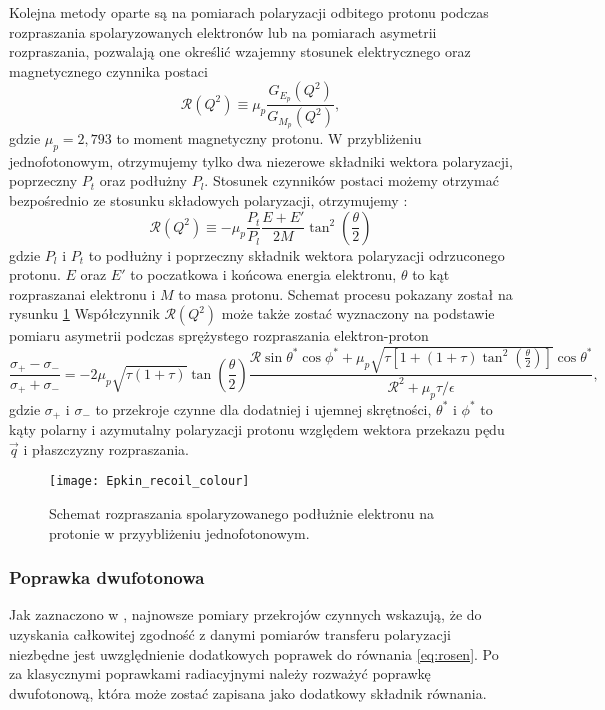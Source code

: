 \documentclass[11pt]{book}
\theoremstyle{definition}
\begin{document}
Kolejna metody oparte są na pomiarach polaryzacji odbitego protonu podczas rozpraszania spolaryzowanych elektronów lub na pomiarach asymetrii rozpraszania, pozwalają one określić wzajemny stosunek elektrycznego oraz magnetycznego czynnika postaci
%
$$
\mathcal{R}\left(Q^2\right) \equiv \mu_p \frac{G_{E_p}\left(Q^2\right)}{G_{M_p}\left(Q^2\right)},
$$
gdzie $\mu_p = 2,793$ to moment magnetyczny protonu. W przybliżeniu jednofotonowym, otrzymujemy tylko dwa niezerowe składniki wektora polaryzacji, poprzeczny $P_t$ oraz podłużny $P_l$. Stosunek czynników postaci możemy otrzymać bezpośrednio ze stosunku składowych polaryzacji, otrzymujemy \cite{2007PrPNP..59..694P}:
%
$$
\mathcal{R}\left(Q^2\right) \equiv -\mu_p  \frac{P_t}{P_l} \frac{E + E'}{2M} \tan^2  \left(\frac{\theta}{2}\right) 
$$
%
gdzie $P_l$ i $P_t$ to podłużny i poprzeczny składnik wektora polaryzacji odrzuconego protonu. $E$ oraz $E'$ to poczatkowa i końcowa energia elektronu, $\theta$ to kąt rozpraszanai elektronu i $M$ to masa protonu. Schemat procesu pokazany został na rysunku \ref{fig:recoil}
%
Współczynnik $\mathcal{R}\left(Q^2\right)$ może także zostać wyznaczony na podstawie pomiaru asymetrii podczas sprężystego rozpraszania elektron-proton \cite{2009PhRvC..79f5204A, 2007PrPNP..59..694P}
%
$$
\frac{\sigma_+ - \sigma_-}{\sigma_+ + \sigma_-} = -2\mu_p \sqrt{\tau \left(1+\tau\right)} \tan \left(\frac{\theta}{2}\right) \frac{\mathcal{R} \sin \theta^* \cos \phi^* + \mu_p \sqrt{\tau \left[ 1 + \left(1+\tau\right) \tan^2 \left(\frac{\theta}{2}\right) \right]} \cos \theta^* }{\mathcal{R}^2 + \mu_p \tau / \epsilon},
$$
%
gdzie $\sigma_+$ i $\sigma_-$ to przekroje czynne dla dodatniej i ujemnej skrętności, $\theta^*$ i $\phi^*$ to kąty polarny i azymutalny polaryzacji protonu względem wektora przekazu pędu $\vec{q}$ i płaszczyzny rozpraszania.
%

\begin{figure}[htp!]
	\centering
	\texttt{[image: Epkin\_recoil\_colour]}
	\caption{Schemat rozpraszania spolaryzowanego podłużnie elektronu na protonie w przyybliżeniu jednofotonowym.} 
	\label{fig:recoil}
\end{figure}



\subsubsection{Poprawka dwufotonowa}
Jak zaznaczono w \cite{2007PhRvC..76c5205A}, najnowsze pomiary przekrojów czynnych wskazują, że do uzyskania całkowitej zgodność z danymi pomiarów transferu polaryzacji niezbędne jest uwzględnienie dodatkowych poprawek do równania \ref{eq:rosen}. Po za klasycznymi poprawkami radiacyjnymi należy rozważyć poprawkę dwufotonową, która może zostać zapisana jako dodatkowy składnik równania.
\end{document}
